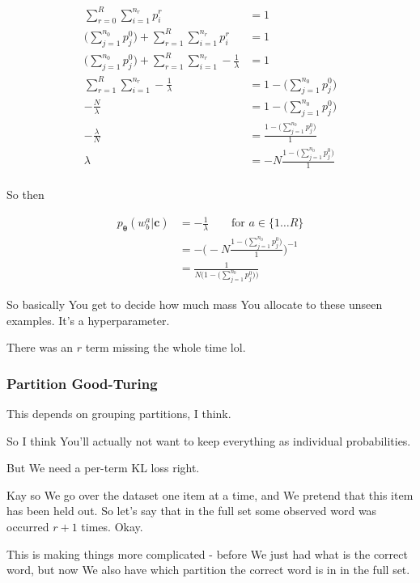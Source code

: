 \documentclass{article}
\newcommand{\vtheta}{\boldsymbol{\theta}}
\newcommand{\model}{p_{\vtheta}}
\newcommand{\context}{\boldsymbol{c}}
\begin{document}
			\begin{align}
				\sum^R_{r=0} \sum^{n_r}_{i=1} p^r_i &= 1\\
				\bigg(\sum^{n_0}_{j=1}p^0_j\bigg) + \sum^R_{r=1} \sum^{n_r}_{i=1} p^r_i &= 1\\
				\bigg(\sum^{n_0}_{j=1}p^0_j\bigg) + \sum^R_{r=1} \sum^{n_r}_{i=1} -\frac{1}{\lambda} &= 1\\
				\sum^R_{r=1} \sum^{n_r}_{i=1} -\frac{1}{\lambda} &= 1 - \bigg(\sum^{n_0}_{j=1}p^0_j\bigg)\\
				-\frac{N}{\lambda} &= 1 - \bigg(\sum^{n_0}_{j=1}p^0_j\bigg)\\
				-\frac{\lambda}{N} &= \frac{1 - \bigg(\sum^{n_0}_{j=1}p^0_j\bigg)}{1}\\
				\lambda &= -N\frac{1 - \bigg(\sum^{n_0}_{j=1}p^0_j\bigg)}{1}\\
			\end{align}
			
			So then
			
			\begin{align}
				\model(w^a_b|\context)  &= -\frac{1}{\lambda}\qquad\text{for }a\in\{1\ldots R\}\\
				&= -\bigg( -N\frac{1 - \bigg(\sum^{n_0}_{j=1}p^0_j\bigg)}{1} \bigg)^{-1}\\
				&= \frac{1}{N \bigg( 1 - \bigg(\sum^{n_0}_{j=1}p^0_j\bigg)\bigg)}
			\end{align}
			
			So basically You get to decide how much mass You allocate to these unseen examples. It's a hyperparameter.
			
			There was an $r$ term missing the whole time lol.
			
			
		\subsubsection{Partition Good-Turing}
		
			This depends on grouping partitions, I think.
			
			So I think You'll actually not want to keep everything as individual probabilities. 
			
			But We need a per-term KL loss right.
			
			Kay so We go over the dataset one item at a time, and We pretend that this item has been held out. So let's say that in the full set some observed word was occurred $r+1$ times. Okay. 
			
			This is making things more complicated - before We just had what is the correct word, but now We also have which partition the correct word is in in the full set. 
			
\end{document}
